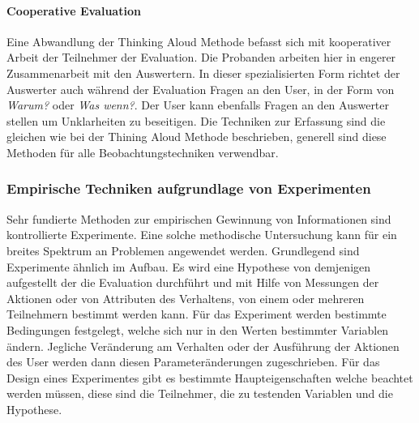 \documentclass[draft=false
              ,paper=a4
              ,twoside=false
              ,fontsize=11pt
              ,headsepline
              ,BCOR10mm
              ,DIV11
              ]{scrbook}
\begin{document}
\paragraph{Cooperative Evaluation} %
\label{par:cooperative_evaluation}
Eine Abwandlung der Thinking Aloud Methode befasst sich mit kooperativer Arbeit der Teilnehmer der Evaluation. Die Probanden arbeiten hier in engerer Zusammenarbeit mit den Auswertern. In dieser spezialisierten Form richtet der Auswerter auch während der Evaluation Fragen an den User, in der Form von \textit{Warum?} oder \textit{Was wenn?}. Der User kann ebenfalls Fragen an den Auswerter stellen um Unklarheiten zu beseitigen. Die Techniken zur Erfassung sind die gleichen wie bei der Thining Aloud Methode beschrieben, generell sind diese Methoden für alle Beobachtungstechniken verwendbar.
\subsubsection{Empirische Techniken aufgrundlage von Experimenten} %
\label{ssub:empirische_techniken_auf_grundlage_von_experimenten}
Sehr fundierte Methoden zur empirischen Gewinnung von Informationen sind kontrollierte Experimente. Eine solche methodische Untersuchung kann für ein breites Spektrum an Problemen angewendet werden. Grundlegend sind Experimente ähnlich im Aufbau. Es wird eine Hypothese von demjenigen aufgestellt der die Evaluation durchführt und mit Hilfe von Messungen der Aktionen oder von Attributen des Verhaltens, von einem oder mehreren Teilnehmern bestimmt werden kann. Für das Experiment werden bestimmte Bedingungen festgelegt, welche sich nur in den Werten bestimmter Variablen ändern. Jegliche Veränderung am Verhalten oder der Ausführung der Aktionen des User werden dann diesen Parameteränderungen zugeschrieben. Für das Design eines Experimentes gibt es bestimmte Haupteigenschaften welche beachtet werden müssen, diese sind die Teilnehmer, die zu testenden Variablen und die Hypothese.
\end{document}
